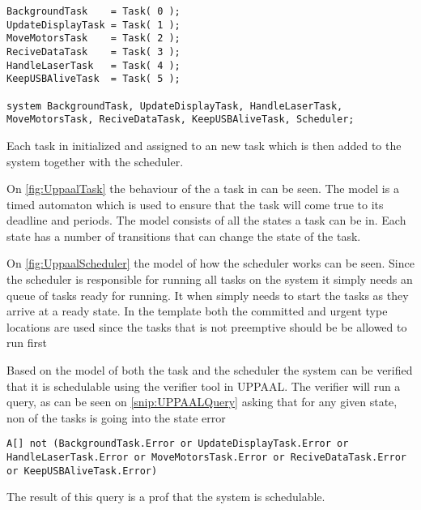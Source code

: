 \begin{lstlisting}[label={snip:UPPAALSystemDeclaration},caption={System declaration from UPPAAL},frame=tlrb,numbers=none]
BackgroundTask    = Task( 0 );
UpdateDisplayTask = Task( 1 );
MoveMotorsTask    = Task( 2 );
ReciveDataTask    = Task( 3 );
HandleLaserTask   = Task( 4 );
KeepUSBAliveTask  = Task( 5 );

system BackgroundTask, UpdateDisplayTask, HandleLaserTask, MoveMotorsTask, ReciveDataTask, KeepUSBAliveTask, Scheduler;
\end{lstlisting}
Each task in initialized and assigned to an new task which is then added to the system together with the scheduler. 

On \autoref{fig:UppaalTask} the behaviour of the a task in can be seen. 
The model is a timed automaton which is used to ensure that the task will come true to its deadline and periods. 
The model consists of all the states a task can be in.
Each state has a number of transitions that can change the state of the task. 


On \autoref{fig:UppaalScheduler} the model of how the scheduler works can be seen. 
Since the scheduler is responsible for running all tasks on the system it simply needs an queue of tasks ready for running. 
It when simply needs to start the tasks as they arrive at a ready state. 
In the template both the committed and urgent type locations are used since the tasks that is not preemptive should be be allowed to run first 

Based on the model of both the task and the scheduler the system can be verified that it is schedulable using the verifier tool in UPPAAL. 
The verifier will run a query, as can be seen on \autoref{snip:UPPAALQuery} asking that for any given state, non of the tasks is going into the state error 
\begin{lstlisting}[label={snip:UPPAALQuery},caption={Query from UPPAAL verifier},frame=tlrb,numbers=none]
A[] not (BackgroundTask.Error or UpdateDisplayTask.Error or HandleLaserTask.Error or MoveMotorsTask.Error or ReciveDataTask.Error or KeepUSBAliveTask.Error)
\end{lstlisting}
The result of this query is a prof that the system is schedulable. 